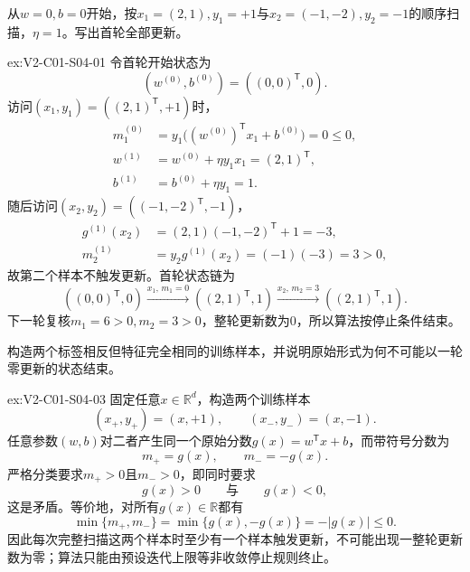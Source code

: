 \begin{SLChapterExercisePairSection}
\begin{exercise}\label{ex:V2-C01-S04-01}
从$w=0,b=0$开始，按$x_1=(2,1),y_1=+1$与$x_2=(-1,-2),y_2=-1$的顺序扫描，$\eta=1$。写出首轮全部更新。
\end{exercise}
\ifSLFullEdition
{}\label{sol:V2-C01-S04-01}
\begin{chapterexercisesolution}{ex:V2-C01-S04-01}
令首轮开始状态为
\[
(w^{(0)},b^{(0)})=((0,0)^{\mathsf T},0).
\]
访问$(x_1,y_1)=((2,1)^{\mathsf T},+1)$时，
\[
\begin{aligned}
m_1^{(0)}
&=y_1\bigl((w^{(0)})^{\mathsf T}x_1+b^{(0)}\bigr)=0\leq0,\\
w^{(1)}&=w^{(0)}+\eta y_1x_1=(2,1)^{\mathsf T},\\
b^{(1)}&=b^{(0)}+\eta y_1=1.
\end{aligned}
\]
随后访问$(x_2,y_2)=((-1,-2)^{\mathsf T},-1)$，
\[
\begin{aligned}
g^{(1)}(x_2)
&=(2,1)(-1,-2)^{\mathsf T}+1=-3,\\
m_2^{(1)}&=y_2g^{(1)}(x_2)=(-1)(-3)=3>0,
\end{aligned}
\]
故第二个样本不触发更新。首轮状态链为
\[
((0,0)^{\mathsf T},0)
\xrightarrow{x_1,\,m_1=0}
((2,1)^{\mathsf T},1)
\xrightarrow{x_2,\,m_2=3}
((2,1)^{\mathsf T},1).
\]
下一轮复核$m_1=6>0,m_2=3>0$，整轮更新数为$0$，所以算法按停止条件结束。
\end{chapterexercisesolution}
\fi

\begin{exercise}\label{ex:V2-C01-S04-03}
构造两个标签相反但特征完全相同的训练样本，并说明原始形式为何不可能以一轮零更新的状态结束。
\end{exercise}
\ifSLFullEdition
{}\label{sol:V2-C01-S04-03}
\begin{chapterexercisesolution}{ex:V2-C01-S04-03}
固定任意$x\in\mathbb R^d$，构造两个训练样本
\[
(x_+,y_+)=(x,+1),
\qquad
(x_-,y_-)=(x,-1).
\]
任意参数$(w,b)$对二者产生同一个原始分数$g(x)=w^{\mathsf T}x+b$，而带符号分数为
\[
m_+=g(x),
\qquad
m_-=-g(x).
\]
严格分类要求$m_+>0$且$m_->0$，即同时要求
\[
g(x)>0
\qquad\text{与}\qquad
g(x)<0,
\]
这是矛盾。等价地，对所有$g(x)\in\mathbb R$都有
\[
\min\{m_+,m_-\}
=\min\{g(x),-g(x)\}
=-|g(x)|\leq0.
\]
因此每次完整扫描这两个样本时至少有一个样本触发更新，不可能出现一整轮更新数为零；算法只能由预设迭代上限等非收敛停止规则终止。
\end{chapterexercisesolution}
\fi


\end{SLChapterExercisePairSection}
